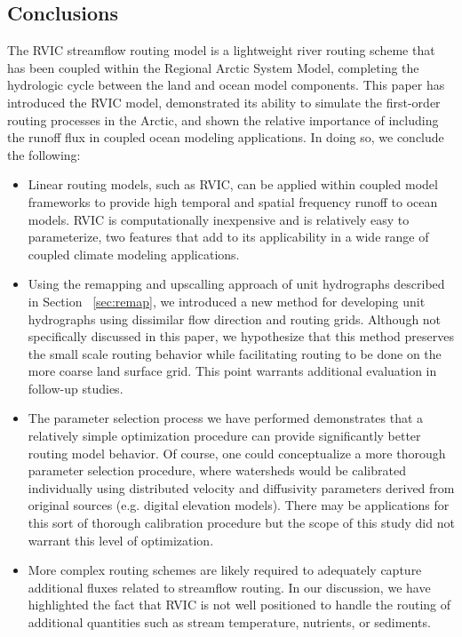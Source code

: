 \documentclass[jgrga, draft]{agutex}
\begin{document}
\begin{article}
\section{Conclusions}
\label{sec:conclusions}

The RVIC streamflow routing model is a lightweight river routing scheme that has been coupled within the Regional Arctic System Model, completing the hydrologic cycle between the land and ocean model components.
This paper has introduced the RVIC model, demonstrated its ability to simulate the first-order routing processes in the Arctic, and shown the relative importance of including the runoff flux in coupled ocean modeling applications.
In doing so, we conclude the following:

\begin{itemize}
\item Linear routing models, such as RVIC, can be applied within coupled model frameworks to provide high temporal and spatial frequency runoff to ocean models.
RVIC is computationally inexpensive and is relatively easy to parameterize, two features that add to its applicability in a wide range of coupled climate modeling applications.
\item Using the remapping and upscalling approach of unit hydrographs described in Section ~\ref{sec:remap}, we introduced a new method for developing unit hydrographs using dissimilar flow direction and routing grids.
Although not specifically discussed in this paper, we hypothesize that this method preserves the small scale routing behavior while facilitating routing to be done on the more coarse land surface grid.
This point warrants additional evaluation in follow-up studies.
\item The parameter selection process we have performed demonstrates that a relatively simple optimization procedure can provide significantly better routing model behavior.
Of course, one could conceptualize a more thorough parameter selection procedure, where watersheds would be calibrated individually using distributed velocity and diffusivity parameters derived from original sources (e.g. digital elevation models).
There may be applications for this sort of thorough calibration procedure but the scope of this study did not warrant this level of optimization.
\item More complex routing schemes are likely required to adequately capture additional fluxes related to streamflow routing.
In our discussion, we have highlighted the fact that RVIC is not well positioned to handle the routing of additional quantities such as stream temperature, nutrients, or sediments.

\end{itemize}
\end{article}
\end{document}
